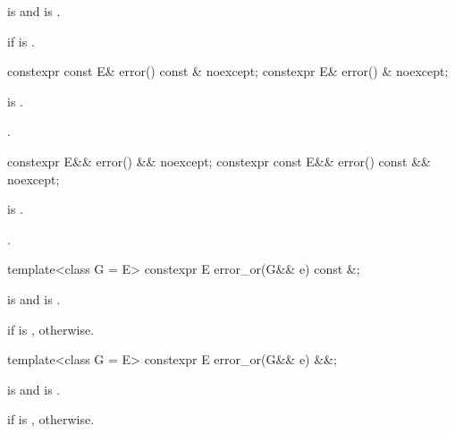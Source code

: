 \begin{itemdescr}
\pnum
\mandates
{} is  and
 is .

\pnum
\throws
{}
if  is .
\end{itemdescr}

%
\begin{itemdecl}
constexpr const E& error() const & noexcept;
constexpr E& error() & noexcept;
\end{itemdecl}

\begin{itemdescr}
\pnum
\hardexpects
{} is .

\pnum
\returns
{}.
\end{itemdescr}

%
\begin{itemdecl}
constexpr E&& error() && noexcept;
constexpr const E&& error() const && noexcept;
\end{itemdecl}

\begin{itemdescr}
\pnum
\hardexpects
{} is .

\pnum
\returns
{}.
\end{itemdescr}

%
\begin{itemdecl}
template<class G = E> constexpr E error_or(G&& e) const &;
\end{itemdecl}

\begin{itemdescr}
\pnum
\mandates
{} is  and
 is .

\pnum
\returns
{} if  is ,
 otherwise.
\end{itemdescr}

%
\begin{itemdecl}
template<class G = E> constexpr E error_or(G&& e) &&;
\end{itemdecl}

\begin{itemdescr}
\pnum
\mandates
{} is  and
 is .

\pnum
\returns
{} if  is ,
 otherwise.
\end{itemdescr}

